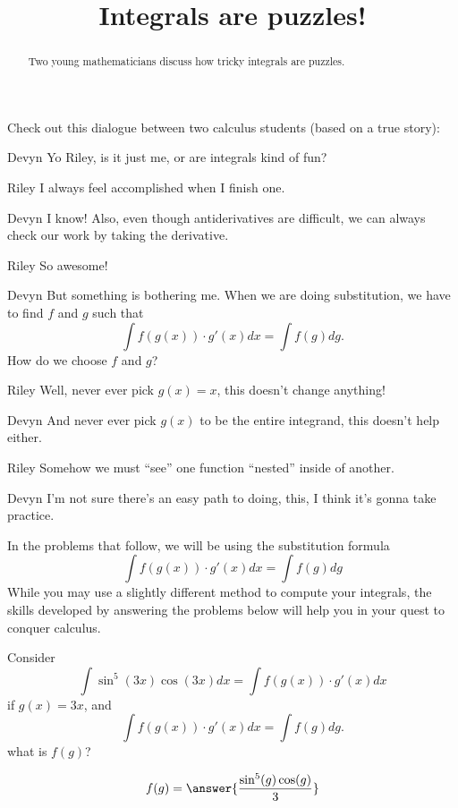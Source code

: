 \documentclass{ximera}
\title[Break-Ground:]{Integrals are puzzles!}
\begin{document}
\begin{abstract}
Two young mathematicians discuss how tricky integrals are puzzles.
\end{abstract}
\maketitle

Check out this dialogue between two calculus students (based on a true
story):

\begin{dialogue}
\item[Devyn] Yo Riley, is it just me, or are integrals kind of fun?
\item[Riley] I always feel accomplished when I finish one.
\item[Devyn] I know! Also, even though antiderivatives are difficult,
  we can always check our work by taking the derivative.
\item[Riley] So awesome!
\item[Devyn] But something is bothering me. When we are doing substitution,
  we have to find $f$ and $g$ such that
  \[
  \int f(g(x)) \cdot g'(x) dx = \int f(g) dg.
  \]
  How do we choose $f$ and $g$?
\item[Riley] Well, never ever pick $g(x) = x$, this doesn't change
    anything!
\item[Devyn] And never ever pick $g(x)$ to be the entire integrand,
  this doesn't help either.
\item[Riley] Somehow we must ``see'' one function ``nested'' inside of
  another.
\item[Devyn] I'm not sure there's an easy path to doing, this, I think
  it's gonna take practice.
\end{dialogue}


In the problems that follow, we will be using the substitution formula
\[
   \int f(g(x)) \cdot g'(x) dx = \int f(g) dg
\]
While you may use a slightly different method to compute your
integrals, the skills developed by answering the problems below will
help you in your quest to conquer calculus.

\begin{problem}
  Consider
  \[
  \int \sin^5(3x) \cos(3x) dx = \int f(g(x)) \cdot g'(x) dx
  \]
  if $g(x) = 3x$, and 
  \[
  \int f(g(x)) \cdot g'(x) dx = \int f(g) dg.
  \]
  what is $f(g)$?
  \begin{prompt}
    \[
    f(g) = \answer{
      \frac{\sin^5(g) \cos(g)}{3}}
    \]
  \end{prompt}
\end{problem}
\end{document}
